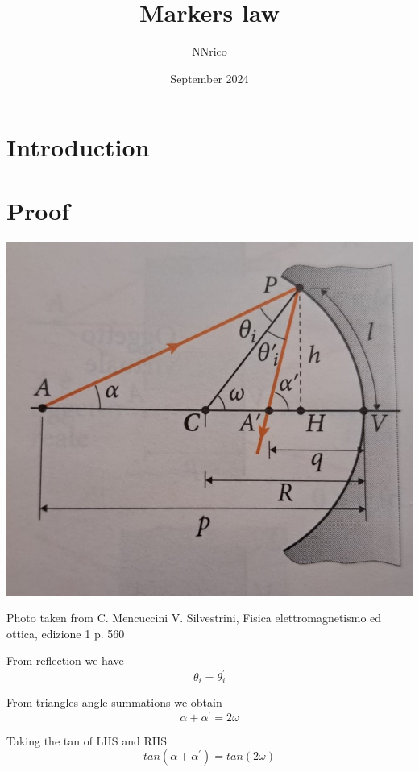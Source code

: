 \documentclass{article}
\title{Markers law}
\author{NNrico}
\date{September 2024}
\begin{document}
\maketitle

\section{Introduction}

\section{Proof}

\includegraphics[scale=0.5]{scheme Mencuccini.jpeg}
\caption{Photo taken from C. Mencuccini V. Silvestrini, Fisica elettromagnetismo ed ottica, edizione 1 p. 560}

From reflection we have
\begin{equation}
    \theta_i = \theta_i^{\prime}
\end{equation}

From triangles angle summations we obtain
\begin{equation}
    \alpha + \alpha^{\prime} = 2\omega
\end{equation}

Taking the tan of LHS and RHS
\begin{equation}
    tan(\alpha + \alpha^{\prime}) = tan(2 \omega)
\end{equation}
\end{document}
